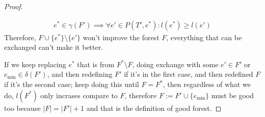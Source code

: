 \documentclass[]{article}
\theoremstyle{definition}
\begin{document}
\begin{proof}
\begin{itemize}
\begin{align}
                    e^*\in \gamma(F') \implies \forall e' \in P(T', e^*): l(e^*)\ge l(e')
                \end{align}
                Therefore, $F\cup \{e^*\}\setminus \{e'\}$ won't improve the forest $F$, everything that can be exchanged can't make it better. 
            \end{itemize}
            If we keep replacing $e^*$ that is from $F^*\setminus F$, doing exchange with some $e' \in F'$ or $e_{\min}\in \delta(F')$, and then redefining $F'$ if it's in the first case, and then redefined $F$ if it's the second case; keep doing this until $F = F^*$, then regardless of what we do, $l(F^*)$ only incrases compare to $F$, therefore $F:= F'\cup \{e_{\min}\}$ must be good too because $|F| = |F'| + 1$ and that is the definition of good forest. 
        \end{proof}
\end{document}

